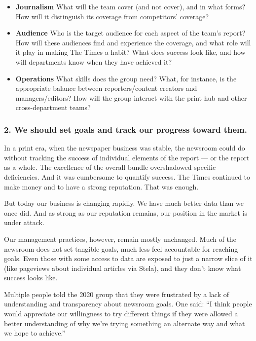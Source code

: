 \begin{itemize}
\tightlist
\item
  \textbf{Journalism} What will the team cover (and not cover), and in
  what forms? How will it distinguish its coverage from competitors'
  coverage?
\item
  \textbf{Audience} Who is the target audience for each aspect of the
  team's report? How will these audiences find and experience the
  coverage, and what role will it play in making The Times a habit? What
  does success look like, and how will departments know when they have
  achieved it?
\item
  \textbf{Operations} What skills does the group need? What, for
  instance, is the appropriate balance between reporters/content
  creators and managers/editors? How will the group interact with the
  print hub and other cross-department teams?
\end{itemize}

\hypertarget{2-we-should-set-goals-and-track-our-progress-toward-them}{%
\subsubsection{2. We should set goals and track our progress toward
them.}\label{2-we-should-set-goals-and-track-our-progress-toward-them}}

In a print era, when the newspaper business was stable, the newsroom
could do without tracking the success of individual elements of the
report --- or the report as a whole. The excellence of the overall
bundle overshadowed specific deficiencies. And it was cumbersome to
quantify success. The Times continued to make money and to have a strong
reputation. That was enough.

But today our business is changing rapidly. We have much better data
than we once did. And as strong as our reputation remains, our position
in the market is under attack.

Our management practices, however, remain mostly unchanged. Much of the
newsroom does not set tangible goals, much less feel accountable for
reaching goals. Even those with some access to data are exposed to just
a narrow slice of it (like pageviews about individual articles via
Stela), and they don't know what success looks like.

Multiple people told the 2020 group that they were frustrated by a lack
of understanding and transparency about newsroom goals. One said: ``I
think people would appreciate our willingness to try different things if
they were allowed a better understanding of why we're trying something
an alternate way and what we hope to achieve.''

